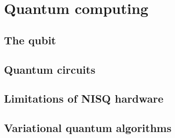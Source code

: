 \chapter{Quantum computing}

\section{The qubit}

\section{Quantum circuits}

\section{Limitations of NISQ hardware}

\section{Variational quantum algorithms}